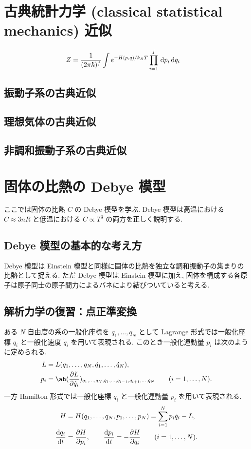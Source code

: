\documentclass[uplatex,diffipdfmx,a4paper,11pt]{jlreq}
\theoremstyle{definition}
\begin{document}
\section{古典統計力学 (classical statistical mechanics) 近似}

\begin{theorem}
  \begin{align}
    Z & = \frac{1}{(2\pi\hbar)^f}\int e^{-H(p, q)/k_BT}\prod_{i=1}^{f}\dl{p_i}\dl{q_i}
  \end{align}
\end{theorem}

\subsection{振動子系の古典近似}
\subsection{理想気体の古典近似}
\subsection{非調和振動子系の古典近似}

\section{固体の比熱の Debye 模型}
ここでは固体の比熱 $C$ の Debye 模型を学ぶ. Debye 模型は高温における $C\approx 3nR$ と低温における $C\propto T^3$ の両方を正しく説明する.
\subsection{Debye 模型の基本的な考え方}
Debye 模型は Einstein 模型と同様に固体の比熱を独立な調和振動子の集まりの比熱として捉える. ただ Debye 模型は Einstein 模型に加え, 固体を構成する各原子は原子同士の原子間力によるバネにより結びついていると考える.

\subsection{解析力学の復習：点正準変換}
ある $N$ 自由度の系の一般化座標を $q_1, \ldots, q_N$ として Lagrange 形式では一般化座標 $q_i$ と一般化速度 $\dot{q}_i$ を用いて表現される. このとき一般化運動量 $p_i$ は次のように定められる.
\begin{align}
  L   & = L(q_1,\ldots,q_N,\dot{q}_1,\ldots,\dot{q}_N),                                                                                     \\
  p_i & = \ab(\diffp{L}{\dot{q}_i})_{q_1,\ldots,q_N,\dot{q}_1,\ldots,\dot{q}_{i-1},\dot{q}_{i+1},\ldots,\dot{q}_N} \qquad (i = 1,\ldots,N).
\end{align}
一方 Hamilton 形式では一般化座標 $q_i$ と一般化運動量 $p_i$ を用いて表現される.
\begin{align}
  H             & = H(q_1,\ldots,q_N,p_1,\ldots,p_N) = \sum_{i=1}^{N}p_i\dot{q}_i - L,              \\
  \diff{q_i}{t} & = \diffp{H}{p_i}, \qquad \diff{p_i}{t} = -\diffp{H}{q_i} \qquad (i = 1,\ldots,N).
\end{align}
\end{document}
